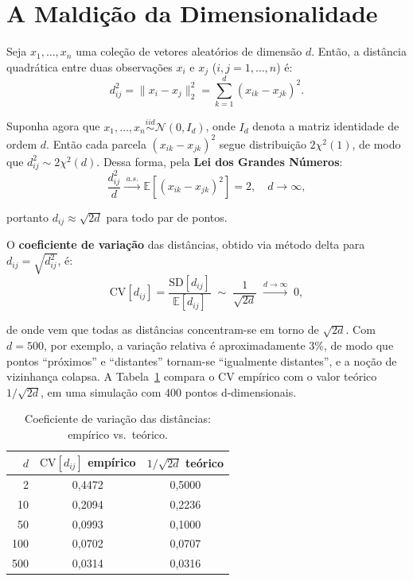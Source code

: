 \documentclass[12pt,a4paper]{report}
\begin{document}
\section{A Maldição da Dimensionalidade}

Seja $x_1, \ldots, x_n$ uma coleção de vetores aleatórios de dimensão $d$. Então, a
distância quadrática entre duas observações $x_i$ e $x_j$
($i, j = 1, \ldots, n$) é:
%
\begin{equation}
  d_{ij}^2 = \|x_i - x_j\|_2^2 = \sum_{k=1}^{d}(x_{ik} - x_{jk})^2.
\end{equation}

Suponha agora que $x_1, \ldots, x_n \overset{iid}{\sim} \mathcal{N}(0, I_d)$,
onde $I_d$ denota a matriz identidade de ordem $d$. Então cada parcela
$(x_{ik} - x_{jk})^2$ segue distribuição $2\chi^2(1)$, de modo que
$d_{ij}^2 \sim 2\chi^2(d)$. Dessa forma, pela \textbf{Lei dos Grandes Números}:
%
\begin{equation}
  \frac{d_{ij}^2}{d} \xrightarrow{\;a.s.\;} \mathbb{E}[(x_{ik} - x_{jk})^2]
  = 2, \quad d \to \infty,
\end{equation}

portanto $d_{ij} \approx \sqrt{2d}$ para todo par de pontos.

\newpage

O \textbf{coeficiente de variação} das distâncias, obtido via método delta para
$d_{ij} = \sqrt{d_{ij}^2}$, é:
%
\begin{equation}
  \text{CV}[d_{ij}] = \frac{\text{SD}[d_{ij}]}{\mathbb{E}[d_{ij}]}
  \;\sim\; \frac{1}{\sqrt{2d}} \;\xrightarrow{d \to \infty}\; 0,
\end{equation}

de onde vem que todas as distâncias concentram-se em torno de $\sqrt{2d}$.
Com $d = 500$, por exemplo, a variação relativa é aproximadamente 3\%, de
modo que pontos ``próximos'' e ``distantes'' tornam-se ``igualmente
distantes'', e a noção de vizinhança colapsa. A Tabela~\ref{tab:cv}
compara o CV empírico com o valor teórico $1/\sqrt{2d}$, em uma simulação
com 400 pontos d-dimensionais.

\begin{table}[ht]
  \centering
  \caption{Coeficiente de variação das distâncias: empírico vs.\ teórico.}
  \label{tab:cv}
  \begin{tabular}{rcc}
    \toprule
    $d$ & $\text{CV}[d_{ij}]$ empírico & $1/\sqrt{2d}$ teórico \\
    \midrule
      2 & 0{,}4472 & 0{,}5000 \\
     10 & 0{,}2094 & 0{,}2236 \\
     50 & 0{,}0993 & 0{,}1000 \\
    100 & 0{,}0702 & 0{,}0707 \\
    500 & 0{,}0314 & 0{,}0316 \\
    \bottomrule
  \end{tabular}
\end{table}
\end{document}
